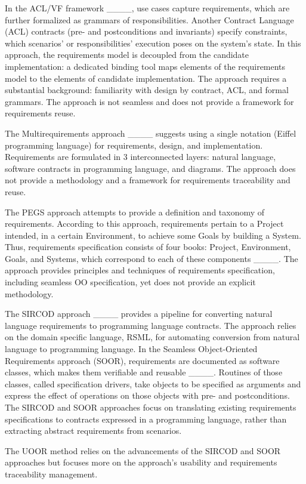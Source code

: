 In the ACL/VF framework ____, use cases capture requirements, which are further formalized as grammars of responsibilities. Another Contract Language (ACL) contracts (pre- and postconditions and invariants) specify constraints, which scenarios' or responsibilities' execution poses on the system's state. In this approach, the requirements model is decoupled from the candidate implementation: a dedicated binding tool maps elements of the requirements model to the elements of candidate implementation. The approach requires a substantial background: familiarity with design by contract, ACL, and formal grammars. The approach is not seamless and does not provide a framework for requirements reuse.

The Multirequirements approach ____ suggests using a single notation (Eiffel programming language) for requirements, design, and implementation. Requirements are formulated in 3 interconnected layers: natural language, software contracts in programming language, and diagrams. The approach does not provide a methodology and a framework for requirements traceability and reuse.

The PEGS approach attempts to provide a definition and taxonomy of requirements. According to this approach, requirements pertain to a Project intended, in a certain Environment, to achieve some Goals by building a System. Thus, requirements specification consists of four books: Project, Environment, Goals, and Systems, which correspond to each of these components ____. The approach provides principles and techniques of requirements specification, including seamless OO specification, yet does not provide an explicit methodology. 

The SIRCOD approach ____ provides a pipeline for converting natural language requirements to programming language contracts. The approach relies on the domain specific language, RSML, for automating conversion from natural language to programming language. In the Seamless Object-Oriented Requirements approach (SOOR), requirements are documented as software classes, which makes them verifiable and reusable ____. Routines of those classes, called specification drivers, take objects to be specified as arguments and express the effect of operations on those objects with pre- and postconditions. The SIRCOD and SOOR approaches focus on translating existing requirements specifications to contracts expressed in a programming language, rather than extracting abstract requirements from scenarios.

The UOOR method relies on the advancements of the SIRCOD and SOOR approaches but focuses more on the approach's usability and requirements traceability management. 

